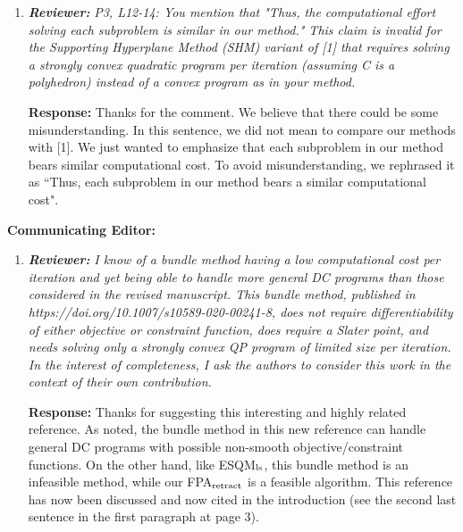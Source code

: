 \documentclass{article}
\begin{document}
\begin{enumerate}
    \item \textit{\textbf{Reviewer:}} \textit{P3, L12-14: You mention that "Thus, the computational effort solving each subproblem is similar in our method."
        This claim is invalid for the Supporting Hyperplane Method (SHM) variant of [1] that requires solving a strongly convex quadratic program per iteration (assuming C is a polyhedron) instead of a convex program as in your method.}

    \textbf{Response:} Thanks for the comment.  We believe that there could be some misunderstanding. In this sentence, we did not mean to compare our methods with [1]. We just wanted to emphasize that each subproblem in our method bears similar computational cost. To avoid misunderstanding, we rephrased it as ``Thus, each subproblem in our method bears a similar computational cost".
\end{enumerate}
\textbf{Communicating Editor:}
\begin{enumerate}
        \item  \textit{\textbf{Reviewer:}} \textit{ I know of a bundle method having a low computational cost per iteration and yet being able to handle more general DC programs than those considered in the revised manuscript. This bundle method, published in https://doi.org/10.1007/s10589-020-00241-8, does not require differentiability of either objective or constraint function, does require a Slater point, and needs solving only a strongly convex QP program of limited size per iteration.  In the interest of completeness, I ask the authors to consider this work in the context of their own contribution.}

        \textbf{Response:} Thanks for suggesting this interesting and highly related reference. As noted, the bundle method in this new reference can handle general  DC programs with possible non-smooth objective/constraint functions. On the other hand, like ESQM$_{\rm ls}$, this bundle method is an infeasible method, while our FPA$_{\rm retract}$ is a feasible algorithm.  This reference has now been discussed and now cited in the introduction (see the second last sentence in the first paragraph at page 3).

\end{enumerate}
\end{document}
